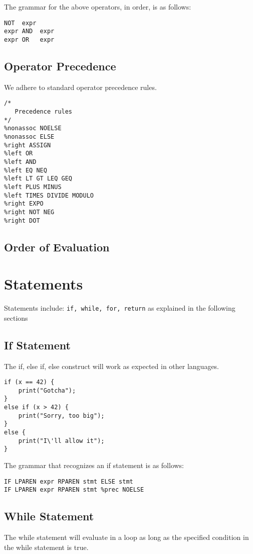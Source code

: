 \documentclass{article}
\begin{document}
The grammar for the above operators, in order, is as follows:
\begin{Verbatim}[frame=single]
NOT  expr
expr AND  expr
expr OR   expr
\end{Verbatim}

\subsection{Operator Precedence}
We adhere to standard operator precedence rules. 


\begin{Verbatim}[frame=single]
/* 
   Precedence rules 
*/
%nonassoc NOELSE 
%nonassoc ELSE 
%right ASSIGN 
%left OR
%left AND
%left EQ NEQ
%left LT GT LEQ GEQ 
%left PLUS MINUS 
%left TIMES DIVIDE MODULO
%right EXPO
%right NOT NEG
%right DOT
\end{Verbatim}

\subsection{Order of Evaluation}

\section{Statements}
Statements include: \texttt{if, while, for, return} as explained in the following sections

\subsection{If Statement}
The if, else if, else construct will work as expected in other languages.

\begin{lstlisting}
if (x == 42) {
	print("Gotcha");
}
else if (x > 42) {
	print("Sorry, too big");
}
else {
	print("I\'ll allow it");
}
\end{lstlisting}

The grammar that recognizes an if statement is as follows:
\begin{Verbatim}[frame=single]
IF LPAREN expr RPAREN stmt ELSE stmt
IF LPAREN expr RPAREN stmt %prec NOELSE
\end{Verbatim}

\subsection{While Statement}
The while statement will evaluate in a loop as long as the specified condition in the while statement is true.
\end{document}
